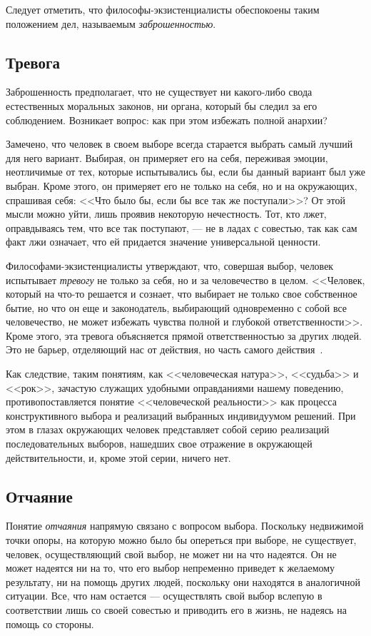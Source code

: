 Следует отметить, что философы-экзистенциалисты обеспокоены
таким положением дел, называемым \emph{заброшенностью}.

\subsection{Тревога}

Заброшенность предполагает, что не существует ни какого-либо свода естественных
моральных законов, ни органа, который бы следил за его соблюдением.
Возникает вопрос: как при этом избежать полной анархии?

Замечено, что человек в своем выборе всегда старается выбрать
самый лучший для него вариант.
Выбирая, он примеряет его на себя, переживая эмоции, неотличимые от тех,
которые испытывались бы, если бы данный вариант был уже выбран.
Кроме этого, он примеряет его не только на себя, но и на окружающих,
спрашивая себя: <<Что было бы, если бы все так же поступали>>?
От этой мысли можно уйти, лишь проявив некоторую нечестность.
Тот, кто лжет, оправдываясь тем, что все так поступают, ---
не в ладах с совестью, так как сам факт лжи означает, что ей придается
значение универсальной ценности.

Философами-экзистенциалисты утверждают, что, совершая выбор,
человек испытывает \emph{тревогу} не только за себя, но и за человечество в целом.
<<Человек, который на что-то решается и сознает, что выбирает не только
свое собственное бытие, но что он еще и законодатель, выбирающий одновременно с собой
все человечество, не может избежать чувства полной и глубокой
ответственности>>.
Кроме этого, эта тревога объясняется прямой ответственностью за других людей.
Это не барьер, отделяющий нас от действия, но часть самого
действия~\cite{sartr_exist_human}.

Как следствие, таким понятиям, как <<человеческая натура>>,
<<судьба>> и <<рок>>, зачастую служащих удобными оправданиями нашему поведению,
противопоставляется понятие <<человеческой реальности>> как процесса конструктивного
выбора и реализаций выбранных индивидуумом решений.
При этом в глазах окружающих человек представляет собой серию реализаций
последовательных выборов, нашедших свое отражение в окружающей действительности,
и, кроме этой серии, ничего нет.

\subsection{Отчаяние}

Понятие \emph{отчаяния} напрямую связано с вопросом выбора.
Поскольку недвижимой точки опоры, на которую можно было бы опереться при выборе,
не существует, человек, осуществляющий свой выбор, не может ни на что надеятся.
Он не может надеятся ни на то, что его выбор непременно приведет к желаемому результату,
ни на помощь других людей, поскольку они находятся в аналогичной ситуации.
Все, что нам остается --- осуществлять свой выбор вслепую в соответствии лишь
со своей совестью и приводить его в жизнь, не надеясь на помощь со стороны.